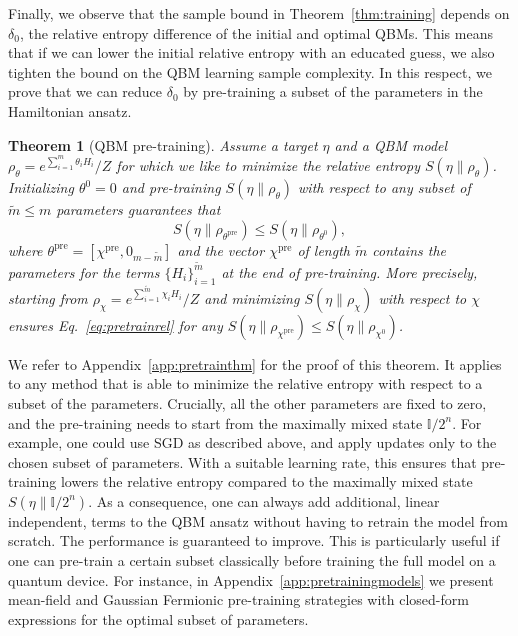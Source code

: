 \documentclass[
    aps,
    prx,
    floatfix,
    nofootinbib,
    onecolumn
]{revtex4-2}
\newtheorem{theorem}{Theorem}
\begin{document}
Finally, we observe that the sample bound in Theorem~\ref{thm:training} depends on $\delta_0$, the relative entropy difference of the initial and optimal QBMs. This means that if we can lower the initial relative entropy with an educated guess, we also tighten the bound on the QBM learning sample complexity. In this respect, we prove that we can reduce $\delta_0$ by pre-training a subset of the parameters in the Hamiltonian ansatz.

\begin{theorem}[QBM pre-training]
\label{thm:pretraining}
    Assume a target $\eta$ and a QBM model $\rho_\theta=e^{\sum_{i=1}^m \theta_i H_i}/Z$ for which we like to minimize the relative entropy $S(\eta \|\rho_\theta)$. Initializing $\theta^0=0$ and pre-training $S(\eta\| \rho_\theta)$ with respect to any subset of $\tilde{m} \leq m $ parameters guarantees that \begin{equation}\label{eq:pretrainrel}
         S(\eta \|\rho_{\theta^\mathrm{pre}}) \leq S(\eta \|\rho_{\theta^0}), 
    \end{equation} where $\theta^\mathrm{pre} = [\chi^{\mathrm{pre}}, 0_{m-\tilde{m}}]$ and the vector $\chi^{\mathrm{pre}}$ of length $\tilde{m}$ contains the parameters for the terms $\{H_i\}_{i=1}^{\tilde{m}}$ at the end of pre-training.
    More precisely, starting from $\rho_\chi=e^{\sum_{i=1}^{\tilde{m}} \chi_i H_i}/Z$ and minimizing $S(\eta \|\rho_\chi)$ with respect to $\chi$ ensures Eq.~\eqref{eq:pretrainrel} for any $S(\eta \|\rho_{\chi^{\mathrm{pre}}})\leq S(\eta \|\rho_{\chi^0})$.
\end{theorem}

We refer to Appendix~\ref{app:pretrainthm} for the proof of this theorem. It applies to any method that is able to minimize the relative entropy with respect to a subset of the parameters.  Crucially, all the other parameters are fixed to zero, and the pre-training needs to start from the maximally mixed state $\mathbb{I}/2^n$. For example, one could use SGD as described above, and apply updates only to the chosen subset of parameters. With a suitable learning rate, this ensures that pre-training lowers the relative entropy compared to the maximally mixed state $S(\eta \|\mathbb{I}/2^n)$. As a consequence, one can always add additional, linear independent, terms to the QBM ansatz without having to retrain the model from scratch. The performance is guaranteed to improve. This is particularly useful if one can pre-train a certain subset classically before training the full model on a quantum device. For instance, in Appendix~\ref{app:pretrainingmodels} we present mean-field and Gaussian Fermionic pre-training strategies with closed-form expressions for the optimal subset of parameters.
\end{document}
